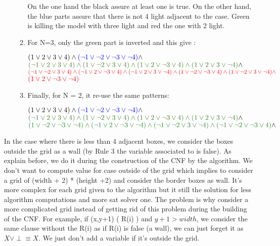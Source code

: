 \documentclass[a4paper]{article}
\begin{document}
\begin{enumerate}
\begin{enumerate}
On the one hand the black assure at least one is true. On the other hand, the blue parts assure that there is not 4 light adjacent to the case. Green is killing the model with three light and red the one with 2 light.
\item For N=3,  only the green part is inverted and this give :\newline
\begin{center}
$ ( 1 \lor 2 \lor 3 \lor 4) \land \textcolor{blue}{( \neg 1 \lor \neg 2 \lor \neg 3 \lor \neg 4)}  \land $ \newline
$\textcolor{OliveGreen}{( \neg 1 \lor 2 \lor 3 \lor 4 ) \land  ( 1 \lor \neg 2 \lor 3 \lor 4 ) \land ( 1 \lor 2 \lor \neg 3 \lor 4 ) \land ( 1 \lor 2 \lor 3 \lor \neg 4 )} \land $ \newline
$\textcolor{red}{( \neg 1 \lor \neg 2 \lor 3 \lor 4) \land ( \neg 1 \lor 2 \lor \neg 3 \lor 4 ) \land ( \neg 1 \lor 2 \lor 3 \lor \neg 4 ) \land ( 1 \lor \neg 2 \lor \neg 3 \lor 4 ) \land ( 1 \lor \neg 2 \lor 3 \lor \neg 4 ) \land} $ \newline $\textcolor{red}{ ( 1 \lor 2 \lor \neg 3 \lor \neg 4 )} $
\end{center}
\item Finally, for N = 2, it re-use the same patterns: \newline
\begin{center}
$ ( 1 \lor 2 \lor 3 \lor 4) \land \textcolor{blue}{( \neg 1 \lor \neg 2 \lor \neg 3 \lor \neg 4)}  \land $ \newline 
$\textcolor{OliveGreen}{( \neg 1 \lor 2 \lor 3 \lor 4 ) \land  ( 1 \lor \neg 2 \lor 3 \lor 4 ) \land ( 1 \lor 2 \lor \neg 3 \lor 4 ) \land ( 1 \lor 2 \lor 3 \lor \neg 4 )} \land $ \newline $\textcolor{ForestGreen}{( 1 \lor \neg 2 \lor \neg 3 \lor \neg 4 ) \land  ( \neg 1 \lor 2 \lor \neg 3 \lor \neg 4 ) \land ( \neg 1 \lor \neg 2 \lor 3 \lor \neg 4 ) \land ( \neg 1 \lor \neg 2 \lor \neg 3 \lor 4 )} \land $
\end{center}
\end{enumerate}
\end{enumerate}

In the case where there is less than 4 adjacent boxes, we consider the boxes outside the grid as a wall (by Rule 3 the variable associated to is false). As explain before, we do it during the construction of the CNF by the algorithm. We don't want to compute value for case outside of the grid which implies to consider a grid of (width + 2) * (height +2) and consider the border boxes as wall. It's more complex for each grid given to the algorithm but it still the solution for less algorithm computations and more sat solver one. The problem is why consider a more complicated grid instead of getting rid of this problem during the building of the CNF. For example, if (x,y+1) ( R(i) ) and $ y+1 > width $, we consider the same clause without the R(i) as if R(i) is false (a wall), we can just forget it as $ X \lor \perp \equiv X $. We just don't add a variable if it's outside the grid.
\end{document}
